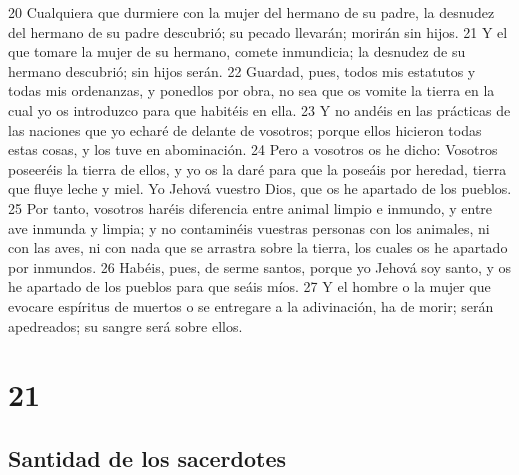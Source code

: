 20 Cualquiera que durmiere con la mujer del hermano de su padre, la desnudez del hermano de su padre descubrió; su pecado llevarán; morirán sin hijos.
21 Y el que tomare la mujer de su hermano, comete inmundicia; la desnudez de su hermano descubrió; sin hijos serán.
22 Guardad, pues, todos mis estatutos y todas mis ordenanzas, y ponedlos por obra, no sea que os vomite la tierra en la cual yo os introduzco para que habitéis en ella.
23 Y no andéis en las prácticas de las naciones que yo echaré de delante de vosotros; porque ellos hicieron todas estas cosas, y los tuve en abominación.
24 Pero a vosotros os he dicho: Vosotros poseeréis la tierra de ellos, y yo os la daré para que la poseáis por heredad, tierra que fluye leche y miel. Yo Jehová vuestro Dios, que os he apartado de los pueblos.
25 Por tanto, vosotros haréis diferencia entre animal limpio e inmundo, y entre ave inmunda y limpia; y no contaminéis vuestras personas con los animales, ni con las aves, ni con nada que se arrastra sobre la tierra, los cuales os he apartado por inmundos.
26 Habéis, pues, de serme santos, porque yo Jehová soy santo, y os he apartado de los pueblos para que seáis míos.
27 Y el hombre o la mujer que evocare espíritus de muertos o se entregare a la adivinación, ha de morir; serán apedreados; su sangre será sobre ellos.

\chapter{21}

\section*{Santidad de los sacerdotes}

